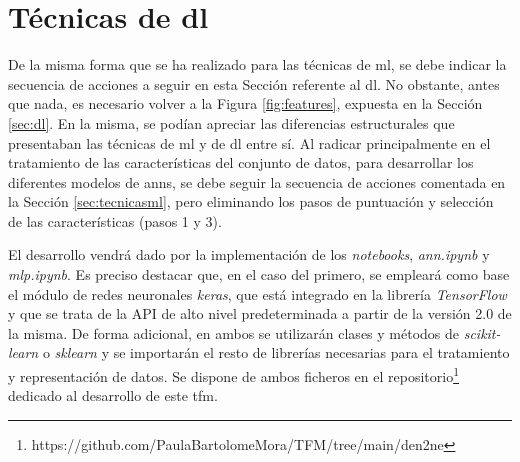 \section{Técnicas de \gls{dl}}
\label{sec:tecnicasdl}

De la misma forma que se ha realizado para las técnicas de \gls{ml}, se debe indicar la secuencia de acciones a seguir en esta Sección referente al \gls{dl}. No obstante, antes que nada, es necesario volver a la Figura \ref{fig:features}, expuesta en la Sección \ref{sec:dl}. En la misma, se podían apreciar las diferencias estructurales que presentaban las técnicas de \gls{ml} y de \gls{dl} entre sí. Al radicar principalmente en el tratamiento de las características del conjunto de datos, para desarrollar los diferentes modelos de \gls{ann}s, se debe seguir la secuencia de acciones comentada en la Sección \ref{sec:tecnicasml}, pero eliminando los pasos de puntuación y selección de las características (pasos 1 y 3).

\vspace{3mm}

El desarrollo vendrá dado por la implementación de los \textit{notebooks}, \textit{ann.ipynb} y \textit{mlp.ipynb}. Es preciso destacar que, en el caso del primero, se empleará como base el módulo de redes neuronales \textit{keras}, que está integrado en la librería \textit{TensorFlow} y que se trata de la API de alto nivel predeterminada a partir de la versión 2.0 de la misma. De forma adicional, en ambos se utilizarán clases y métodos de \textit{scikit-learn} o \textit{sklearn} y se importarán el resto de librerías necesarias para el tratamiento y representación de datos. Se dispone de ambos ficheros en el repositorio\footnote{https://github.com/PaulaBartolomeMora/TFM/tree/main/den2ne} dedicado al desarrollo de este \gls{tfm}.




